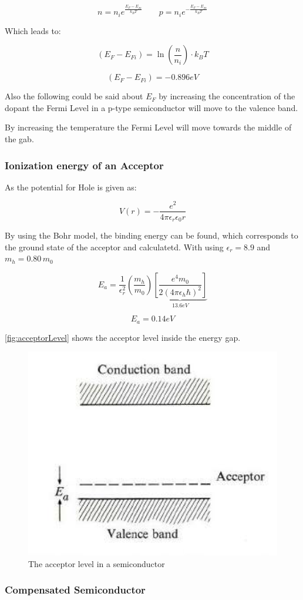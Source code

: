 $$n = n_i e^{\frac{E_F-E_{Fi}}{k_BT}}  \qquad p = n_i e^{-\frac{E_F-E_{Fi}}{k_BT}}$$

Which leads to:

$$(E_F-E_{Fi}) = \ln\left( \frac{n}{n_i} \right) \cdot k_BT$$

$$(E_F-E_{Fi}) = -0.896 eV $$

Also the following could be said about $E_F$
by increasing the concentration of the dopant 
the Fermi Level in a p-type semiconductor will
move to the valence band.

By increasing the temperature the Fermi Level
will move towards the middle of the gab.

\subsubsection*{Ionization energy of an Acceptor}

As the potential for Hole is given as:

\begin{equation}
  V(r) = -\frac{e^2}{4\pi \epsilon_r \epsilon_0 r}
\end{equation}

By using the Bohr model, the binding energy can be found, which
corresponds to the ground state of the acceptor and calculatetd.
With using $\epsilon_r = 8.9$ and $m_h = 0.80\,m_0$


$$
E_a = \frac{1}{\epsilon_r^2} \left(\frac{m_h}{m_0}\right) \underbrace{\left[\frac{e^4m_0}{2(4\pi\epsilon_h\hbar)^2}\right]}_{13.6eV}
$$

$$E_a =  0.14eV$$

\autoref{fig:acceptorLevel} shows the acceptor level inside the energy gap.

\begin{figure}[H]
  \centering
  \includegraphics[width=0.35\linewidth]{Graphics/Chapter3/acceptorLevel.png}
  \caption{The acceptor level in a semiconductor \cite[Elementary Solid State Physics p. 268]{elementary_SSP} }
  \label{fig:acceptorLevel}
\end{figure}

\subsubsection*{Compensated Semiconductor}

